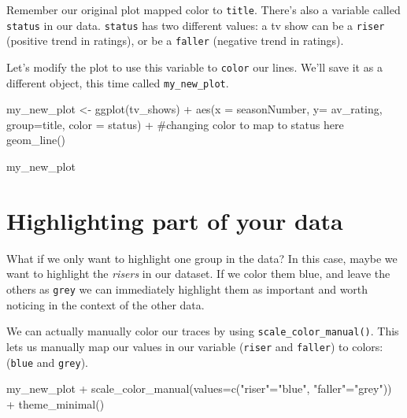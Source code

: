 \documentclass[
  letterpaper,
  DIV=11,
  numbers=noendperiod]{scrreprt}
\newenvironment{Shaded}{\begin{snugshade}}{\end{snugshade}}
\newcommand{\NormalTok}[1]{\textcolor[rgb]{0.00,0.23,0.31}{#1}}
\begin{document}
Remember our original plot mapped color to \texttt{title}. There's also
a variable called \texttt{status} in our data. \texttt{status} has two
different values: a tv show can be a \texttt{riser} (positive trend in
ratings), or be a \texttt{faller} (negative trend in ratings).

Let's modify the plot to use this variable to \texttt{color} our lines.
We'll save it as a different object, this time called
\texttt{my\_new\_plot}.

\begin{Shaded}
\begin{Highlighting}[]
\NormalTok{my\_new\_plot \textless{}{-} }
\NormalTok{  ggplot(tv\_shows) + }
\NormalTok{    aes(x = seasonNumber, }
\NormalTok{        y= av\_rating, }
\NormalTok{        group=title, }
\NormalTok{        color = status) +   \#changing \textasciigrave{}color\textasciigrave{} to map to \textasciigrave{}status\textasciigrave{} here}
\NormalTok{    geom\_line()}

\NormalTok{my\_new\_plot}
\end{Highlighting}
\end{Shaded}

\section*{Highlighting part of your
data}\label{highlighting-part-of-your-data}


What if we only want to highlight one group in the data? In this case,
maybe we want to highlight the \emph{risers} in our dataset. If we color
them blue, and leave the others as \texttt{grey} we can immediately
highlight them as important and worth noticing in the context of the
other data.

We can actually manually color our traces by using
\texttt{scale\_color\_manual()}. This lets us manually map our values in
our variable (\texttt{riser} and \texttt{faller}) to colors:
(\texttt{blue} and \texttt{grey}).

\begin{Shaded}
\begin{Highlighting}[]
\NormalTok{my\_new\_plot + }
\NormalTok{  scale\_color\_manual(values=c("riser"="blue",}
\NormalTok{                              "faller"="grey")) +}
\NormalTok{  theme\_minimal()}
\end{Highlighting}
\end{Shaded}
\end{document}
